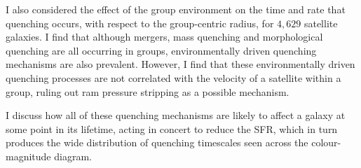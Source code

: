 \documentclass[12pt,useAMS]{ociamthesis}  %
\begin{document}
\begin{abstractlong}
I also considered the effect of the group environment on the time and rate that quenching occurs, with respect to the group-centric radius, for $4,629$ satellite galaxies. I find that although mergers, mass quenching and morphological quenching are all occurring in groups, environmentally driven quenching mechanisms are also prevalent. However, I find that these environmentally driven quenching processes are not correlated with the velocity of a satellite within a group, ruling out ram pressure stripping as a possible mechanism. 

I discuss how all of these quenching mechanisms are likely to affect a galaxy at some point in its lifetime, acting in concert to reduce the SFR, which in turn produces the wide distribution of quenching timescales seen across the colour-magnitude diagram.

\end{abstractlong}
\end{document}
